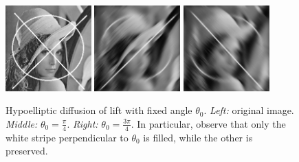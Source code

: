 \documentclass[proc]{edpsmath}
\begin{document}
\begin{figure}
  \includegraphics[height=3.3cm]{imgs/lena-circle}\qquad
  \includegraphics[height=3.3cm]{imgs/lena-pi2}\qquad
  \includegraphics[height=3.3cm]{imgs/lena-3pi2}
  \caption{Hypoelliptic diffusion of lift with fixed angle $\theta_0$. \emph{Left:} original image. \emph{Middle:}  $\theta_0=\frac{\pi}4$. \emph{Right:} $\theta_0=\frac{3\pi}4$. In particular, observe that only the white stripe perpendicular to $\theta_0$ is filled, while the other is preserved.  }
  \label{fig:PH-theta0}
\end{figure}
\end{document}
